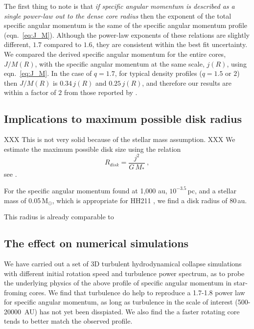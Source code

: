 The first thing to note is that \emph{if specific angular momentum is described as a single power-law out to the dense core radius} 
then the exponent of the total specific angular momentum is the same of the 
specific angular momentum profile (eqn.~\ref{eq:J_M}). 
%
Although the power-law exponents of these relations are slightly different, 
$1.7$ compared to $1.6$, they are 
consistent within the best fit uncertainty. 
We compared the derived specific angular momentum for the entire cores, $J/M(R)$, 
with the specific angular momentum at the same scale, $j(R)$, using eqn.~\ref{eq:J_M}. 
In the case of $q=1.7$, for typical density profiles ($q=1.5$ or $2$) then 
$J/M(R)$ is $0.34\,j(R)$ and $0.25\,j(R)$, and therefore our results are within a factor of $2$
from those reported by \cite{Goodman_1993}. 

\subsection{Implications to maximum possible disk radius}
XXX This is not very solid because of the stellar mass assumption. XXX
We estimate the maximum possible disk size using the relation
\begin{equation}
R_{disk} = \frac{j^2}{G\,M_*}~,
\end{equation}
see \cite{Yen_2015}.

For the specific angular momentum found at 1,000 au, $10^{-3.5}$\,\kms pc, and a stellar mass 
of 0.05\,M$_\odot$, which is appropriate for HH211 \citep{Lee_2009,Froebrich_2003},  
we find a disk radius of 80\,au.

This radius is already comparable to 

\subsection{The effect on numerical simulations}
We have carried out a set of 3D turbulent hydrodynamical collapse simulations
with different initial rotation speed and turbulence power spectrum,
as to probe the underlying physics of the above profile
of specific angular momentum in star-froming cores.
We find that turbulence do help to reproduce a 1.7-1.8 power law for
specific angular momentum, as long as turbulence in the scale of interest
(500-20000~AU) has not yet been disspiated. We also find the a faster
rotating core tends to better match the observed profile.

